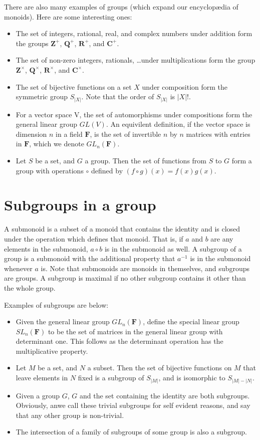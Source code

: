\documentclass{report}
\begin{document}
There are also many examples of groups (which expand our encyclop\ae dia of monoids). Here are some interesting ones:
\begin{itemize}
    \item The set of integers, rational, real, and complex numbers under addition form the groups $\mathbf{Z}^+$, $\mathbf{Q}^+$, $\mathbf{R}^+$, and $\mathbf{C}^+$.
    \item The set of non-zero integers, rationals, \dots under multiplications form the group $\mathbf{Z}^\times$, $\mathbf{Q}^\times$, $\mathbf{R}^\times$, and $\mathbf{C}^\times$.
    \item The set of bijective functions on a set $X$ under composition form the symmetric group $S_{|X|}$. Note that the order of $S_{|X|}$ is $|X|!$.
    \item For a vector space V, the set of automorphisms under compositions form the general linear group $GL(V)$. An equivilent definition, if the vector space is dimension $n$ in a field $\mathbf{F}$, is the set of invertible $n$ by $n$ matrices with entries in $\mathbf{F}$, which we denote $GL_n(\mathbf{F})$.
    \item Let $S$ be a set, and $G$ a group. Then the set of functions from $S$ to $G$ form a group with operations $\circ$ defined by $(f \circ g)(x) = f(x)g(x)$.
\end{itemize}

\section{Subgroups in a group}

A submonoid is a subset of a monoid that contains the identity and is closed under the operation which defines that monoid. That is, if $a$ and $b$ are any elements in the submonoid, $a \circ b$ is in the submonoid as well. A subgroup of a group is a submonoid with the additional property that $a^{-1}$ is in the submonoid whenever $a$ is. Note that submonoids are monoids in themselves, and subgroups are groups. A subgroup is maximal if no other subgroup contains it other than the whole group.

Examples of subgroups are below:
\begin{itemize}
    \item Given the general linear group $GL_n(\mathbf{F})$, define the special linear group $SL_n(\mathbf{F})$ to be the set of matrices in the general linear group with determinant one. This follows as the determinant operation has the multiplicative property.
    \item Let $M$ be a set, and $N$ a subset. Then the set of bijective functions on $M$ that leave elements in $N$ fixed is a subgroup of $S_{|M|}$, and is isomorphic to $S_{|M| - |N|}$.
    \item Given a group $G$, $G$ and the set containing the identity are both subgroups. Obviously, anwe call these trivial subgroups for self evident reasons, and say that any other group is non-trivial.
    \item The intersection of a family of subgroups of some group is also a subgroup.
\end{itemize}
\end{document}
